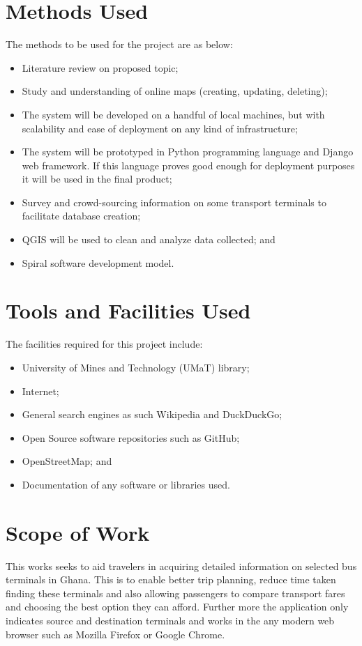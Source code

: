 \section{Methods Used}
The methods to be used for the project are as below:
\begin{itemize}
	\item Literature review on proposed topic;
	\item Study and understanding of online maps (creating, updating, deleting);
	\item The system will be developed on a handful of local machines, but with scalability and ease of deployment on any kind of infrastructure;
	\item The system will be prototyped in Python programming language and Django web framework. If this language proves good enough for deployment purposes it will be used in the final product;
	\item Survey and crowd-sourcing information on some transport terminals to facilitate database creation;
	\item QGIS will be used to clean and analyze data collected; and
	\item Spiral software development model.
\end{itemize}

\section{Tools and Facilities Used}
The facilities required for this project include:
\begin{itemize}
	\item University of Mines and Technology (UMaT) library;
	\item Internet;
	\item General search engines as such Wikipedia and DuckDuckGo;
	\item Open Source software repositories such as GitHub;
	\item OpenStreetMap; and
	\item Documentation of any software or libraries used.
\end{itemize}

\section{Scope of Work}
This works seeks to aid travelers in acquiring detailed information on selected bus terminals in Ghana. This is to enable better trip planning, reduce time taken finding these terminals and also allowing passengers to compare transport fares and choosing the best option they can afford.
Further more the application only indicates source and destination terminals and works in the any modern web browser such as Mozilla Firefox or Google Chrome.

